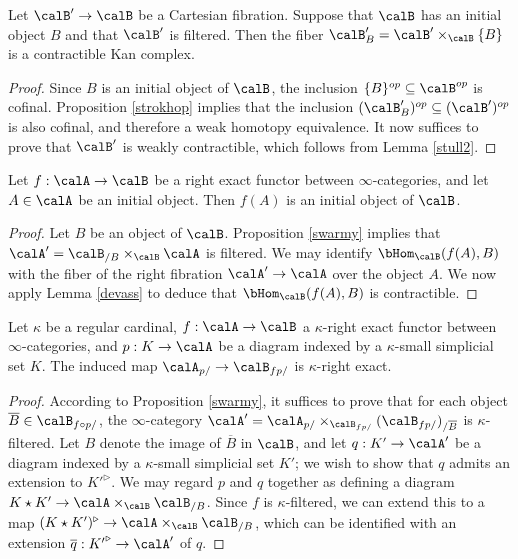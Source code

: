 \begin{lemma}\label{devass}
Let $\calB' \rightarrow \calB$ be a Cartesian fibration. Suppose that $\calB$ has an initial object
$B$ and that $\calB'$ is filtered. Then the fiber $\calB'_{B} = \calB' \times_{\calB} \{B\}$ is a contractible Kan complex.
\end{lemma}

\begin{proof}
Since $B$ is an initial object of $\calB$, the inclusion $\{ B\}^{op} \subseteq \calB^{op}$ is cofinal. Proposition \ref{strokhop} implies that the inclusion $(\calB'_{B})^{op} \subseteq (\calB')^{op}$ is also cofinal, and therefore a weak homotopy equivalence. It now suffices to prove that $\calB'$ is weakly contractible, which follows from Lemma \ref{stull2}.
\end{proof}

\begin{lemma}\label{druv}
Let $f: \calA \rightarrow \calB$ be a right exact functor between $\infty$-categories, and let
$A \in \calA$ be an initial object. Then $f(A)$ is an initial object of $\calB$.
\end{lemma}

\begin{proof}
Let $B$ be an object of $\calB$. Proposition \ref{swarmy} implies that
$\calA' = \calB_{/B} \times_{\calB} \calA$ is filtered. We may identify
$\bHom_{\calB}(f(A), B)$ with the fiber of the right fibration $\calA' \rightarrow \calA$ over the object $A$. We now apply Lemma \ref{devass} to deduce that $\bHom_{\calB}(f(A),B)$ is contractible.
\end{proof}

\begin{lemma}\label{devic}
Let $\kappa$ be a regular cardinal, $f: \calA \rightarrow \calB$ a $\kappa$-right exact functor between $\infty$-categories, and $p: K \rightarrow \calA$ be a diagram indexed by a $\kappa$-small simplicial set $K$.
The induced map $\calA_{p/} \rightarrow \calB_{f p/}$ is $\kappa$-right exact.
\end{lemma}

\begin{proof}
According to Proposition \ref{swarmy}, it suffices to prove that for each object
$\overline{B} \in \calB_{f \circ p/}$, the $\infty$-category
$\calA' = \calA_{p/} \times_{\calB_{f p/}} ( \calB_{f p/} )_{/\overline{B}}$ is $\kappa$-filtered.
Let $B$ denote the image of $\overline{B}$ in $\calB$, and let
$q: K' \rightarrow \calA'$ be a diagram indexed by a $\kappa$-small simplicial set $K'$;
we wish to show that $q$ admits an extension to ${K'}^{\triangleright}$. We may regard $p$ and $q$ together as defining a diagram
$K \star K' \rightarrow \calA \times_{\calB} \calB_{/B}$. Since $f$ is $\kappa$-filtered,
we can extend this to a map
$(K \star K')^{\triangleright} \rightarrow \calA \times_{\calB} \calB_{/B}$, which can be identified with an extension $\overline{q}: {K'}^{\triangleright} \rightarrow \calA'$ of $q$.
\end{proof}

